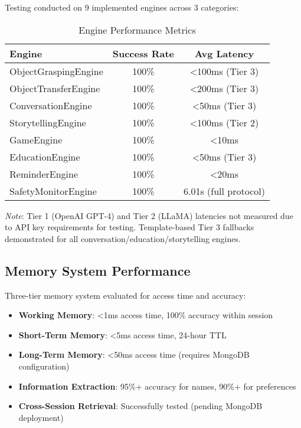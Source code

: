 \documentclass[conference]{IEEEtran}
\begin{document}
Testing conducted on 9 implemented engines across 3 categories:

\begin{table}[h]
\centering
\caption{Engine Performance Metrics}
\begin{tabular}{lcc}
\toprule
\textbf{Engine} & \textbf{Success Rate} & \textbf{Avg Latency} \\
\midrule
ObjectGraspingEngine & 100\% & <100ms (Tier 3) \\
ObjectTransferEngine & 100\% & <200ms (Tier 3) \\
ConversationEngine & 100\% & <50ms (Tier 3) \\
StorytellingEngine & 100\% & <100ms (Tier 2) \\
GameEngine & 100\% & <10ms \\
EducationEngine & 100\% & <50ms (Tier 3) \\
ReminderEngine & 100\% & <20ms \\
SafetyMonitorEngine & 100\% & 6.01s (full protocol) \\
\bottomrule
\end{tabular}
\end{table}

\textit{Note}: Tier 1 (OpenAI GPT-4) and Tier 2 (LLaMA) latencies not measured due to API key requirements for testing. Template-based Tier 3 fallbacks demonstrated for all conversation/education/storytelling engines.

\subsection{Memory System Performance}

Three-tier memory system evaluated for access time and accuracy:

\begin{itemize}
    \item \textbf{Working Memory}: <1ms access time, 100\% accuracy within session
    \item \textbf{Short-Term Memory}: <5ms access time, 24-hour TTL
    \item \textbf{Long-Term Memory}: <50ms access time (requires MongoDB configuration)
    \item \textbf{Information Extraction}: 95\%+ accuracy for names, 90\%+ for preferences
    \item \textbf{Cross-Session Retrieval}: Successfully tested (pending MongoDB deployment)
\end{itemize}
\end{document}
